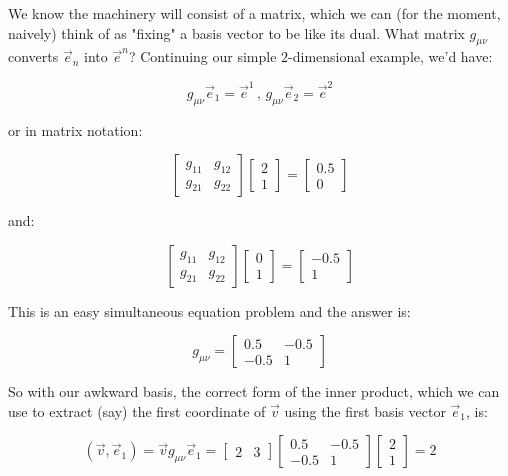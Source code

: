 We know the machinery will consist of a matrix, which we can (for the moment, naively) think of as "fixing" a basis vector to be like its dual. What matrix $g_{\mu\nu}$ converts $\vec{e}_n$ into $\vec{e}^n$? Continuing our simple $2$-dimensional example, we'd have:

$$
g_{\mu\nu} \vec{e}_1 = \vec{e}^1 \,,\, g_{\mu\nu} \vec{e}_2 = \vec{e}^2
$$

or in matrix notation:

$$
\begin{bmatrix}g_{11} & g_{12} \\ g_{21} & g_{22}\end{bmatrix}
\begin{bmatrix}2 \\ 1\end{bmatrix} = 
\begin{bmatrix}0.5 \\ 0\end{bmatrix}
$$

and:

$$
\begin{bmatrix}g_{11} & g_{12} \\ g_{21} & g_{22}\end{bmatrix}
\begin{bmatrix}0 \\ 1\end{bmatrix} = 
\begin{bmatrix}-0.5 \\ 1\end{bmatrix}
$$

This is an easy simultaneous equation problem and the answer is:

$$
g_{\mu\nu} = \begin{bmatrix}0.5 & -0.5 \\ -0.5 & 1\end{bmatrix}
$$

So with our awkward basis, the correct form of the inner product, which we can use to extract (say) the first coordinate of $\vec{v}$ using the first basis vector $\vec{e}_1$, is:

$$
(\vec{v}, \vec{e}_1) =
\vec{v} g_{\mu\nu} \vec{e}_1 =
\begin{bmatrix}2 & 3\end{bmatrix} 
\begin{bmatrix}0.5 & -0.5 \\ -0.5 & 1\end{bmatrix}
\begin{bmatrix}2 \\ 1\end{bmatrix}
=
2
$$

